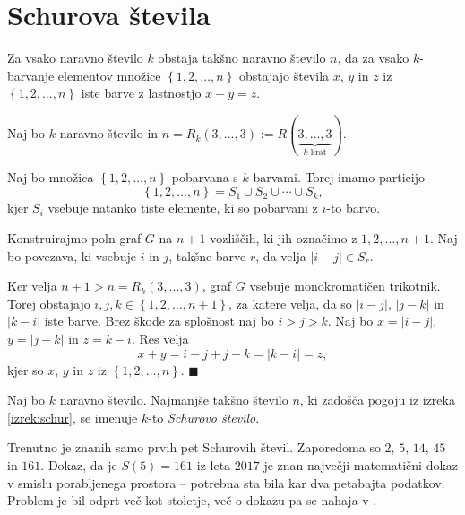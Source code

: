 \documentclass[twoside,11pt]{article}
\providecommand{\set}[1]{\left\{#1\right\}}
\providecommand{\abs}[1]{\left\lvert #1\right\rvert}
\begin{document}
\section{Schurova števila}

\begin{izrek}[Schur] \label{izrek:schur}
    Za vsako naravno število $k$ obstaja takšno naravno število $n$, da za vsako 
    $k$-barvanje elementov množice $\set{1, 2, \dots, n}$ obstajajo števila $x$, $y$ in $z$
    iz $\set{1, 2, \dots, n}$ iste barve z lastnostjo $x + y = z$.
\end{izrek}

\begin{dokaz}
    Naj bo $k$ naravno število in $n = R_k(3, \dots, 3) := R(\underbrace{3, \dots, 3}_{\text{$k$-krat}})$.
    
    Naj bo množica $\set{1, 2, \dots, n}$ pobarvana s $k$ barvami. 
    Torej imamo particijo
    \[
        \set{1, 2, \dots, n} = S_1 \cup S_2 \cup \cdots \cup S_k,
    \]
    kjer $S_i$ vsebuje natanko tiste elemente, ki so pobarvani z $i$-to barvo.

    Konstruirajmo poln graf $G$ na $n+1$ vozliščih, ki jih označimo z
    $1, 2, \dots, n+1$. Naj bo povezava, ki vsebuje $i$ in $j$, takšne barve $r$,
    da velja $\abs{i-j} \in S_r$. 

    Ker velja $n+1 > n = R_k(3, \dots, 3)$, graf $G$ vsebuje monokromatičen 
    trikotnik. Torej obstajajo $i, j, k \in \set{1,2, \dots, n+1}$, za katere 
    velja, da so $\abs{i-j}$, $\abs{j-k}$ in $\abs{k-i}$ iste barve. Brez škode 
    za splošnost naj bo $i > j > k$. Naj bo $x = \abs{i - j}$, $y = \abs{j - k}$ in 
    $z = {k - i}$. Res velja
    \[
        x + y = i - j + j - k = \abs{k - i} = z,
    \]
    kjer so $x$, $y$ in $z$ iz $\set{1, 2, \dots, n}$. \hfill $\blacksquare$
\end{dokaz}

\begin{definicija}
    Naj bo $k$ naravno število. Najmanjše takšno število $n$, ki zadošča 
    pogoju iz izreka \ref{izrek:schur}, se imenuje 
    $k$-to \emph{Schurovo število}.
\end{definicija}

Trenutno je znanih samo prvih pet Schurovih števil. Zaporedoma so $2$, $5$,
$14$, $45$ in $161$. Dokaz, da je $S(5) = 161$ iz leta $2017$ je znan največji 
matematični dokaz v smislu porabljenega prostora -- potrebna sta bila 
kar dva petabajta podatkov. Problem je bil odprt več kot stoletje, več 
o dokazu pa se nahaja v \cite{schur}.
\end{document}
